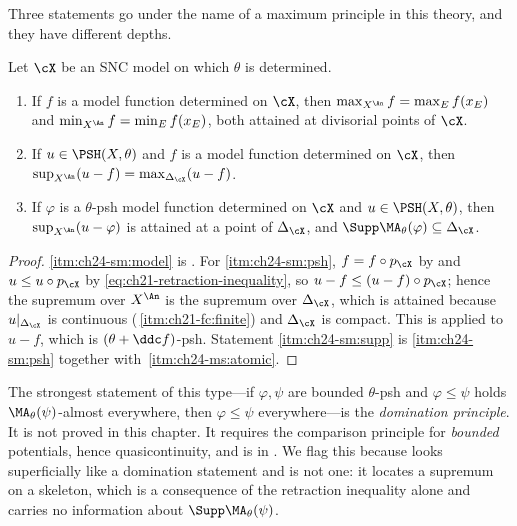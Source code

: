 Three statements go under the name of a maximum principle in this theory,
and they have different depths.

\begin{proposition}
\label{prop:ch24-skeletal-maximum}
Let \(\cX\) be an SNC model on which \(\theta\) is determined.
\begin{enumerate}
\item\label{itm:ch24-sm:model} If \(f\) is a model function determined on
 \(\cX\), then \(\max_{X^{\An}}f=\max_{E}f(x_E)\) and
 \(\min_{X^{\An}}f=\min_Ef(x_E)\), both attained at divisorial points of
 \(\cX\).
\item\label{itm:ch24-sm:psh} If \(u\in\PSH(X,\theta)\) and \(f\) is a model
 function determined on \(\cX\), then
 \(\sup_{X^{\An}}(u-f)=\max_{\Delta_{\cX}}(u-f)\).
\item\label{itm:ch24-sm:supp} If \(\varphi\) is a \(\theta\)-psh model
 function determined on \(\cX\) and \(u\in\PSH(X,\theta)\), then
 \(\sup_{X^{\An}}(u-\varphi)\) is attained at a point of \(\Delta_{\cX}\),
 and \(\Supp\MA_\theta(\varphi)\subseteq\Delta_{\cX}\).
\end{enumerate}
\end{proposition}

\begin{proof}
\cref{itm:ch24-sm:model} is .  For
\cref{itm:ch24-sm:psh}, \(f=f\circ p_{\cX}\) by
 and \(u\leq u\circ p_{\cX}\) by
\eqref{eq:ch21-retraction-inequality}, so
\(u-f\leq(u-f)\circ p_{\cX}\); hence the supremum over \(X^{\An}\) is the
supremum over \(\Delta_{\cX}\), which is attained because
\(u|_{\Delta_{\cX}}\) is continuous
(\,\cref{itm:ch21-fc:finite}) and
\(\Delta_{\cX}\) is compact.  This is
 applied to \(u-f\), which is
\((\theta+\ddc f)\)-psh.  Statement \cref{itm:ch24-sm:supp} is
\cref{itm:ch24-sm:psh} together with
\,\cref{itm:ch24-ms:atomic}.
\end{proof}

\begin{remark}
\label{rem:ch24-domination-scope}
The strongest statement of this type---if \(\varphi,\psi\) are bounded
\(\theta\)-psh and \(\varphi\leq\psi\) holds
\(\MA_\theta(\psi)\)-almost everywhere, then \(\varphi\leq\psi\)
everywhere---is the \emph{domination principle}.  It is not proved in this
chapter.  It requires the comparison principle for \emph{bounded}
potentials, hence quasicontinuity, and is
 in .  We
flag this because  looks superficially like
a domination statement and is not one: it locates a supremum on a skeleton,
which is a consequence of the retraction inequality alone and carries no
information about \(\Supp\MA_\theta(\psi)\).
\end{remark}

